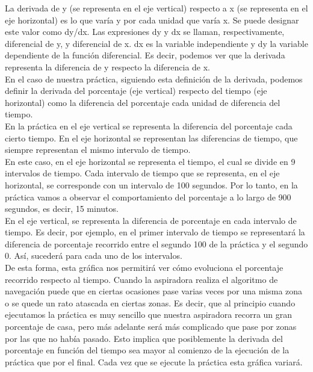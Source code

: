 La derivada de y (se representa en el eje vertical) respecto a x (se representa en el eje horizontal) es lo que varía y por cada unidad que varía x. Se puede designar este valor como dy/dx. Las expresiones dy y dx se llaman, respectivamente, diferencial de y, y diferencial de x. dx es la variable independiente y dy la variable dependiente de la función diferencial. Es decir, podemos ver que la derivada representa la diferencia de y respecto la diferencia de x. \\

En el caso de nuestra práctica, siguiendo esta definición de la derivada, podemos definir la derivada del porcentaje (eje vertical) respecto del tiempo (eje horizontal) como la diferencia del porcentaje cada unidad de diferencia del tiempo.\\

En la práctica en el eje vertical se representa la diferencia del porcentaje cada cierto tiempo. En el eje horizontal se representan las diferencias de tiempo, que siempre representan el mismo intervalo de tiempo. \\

En este caso, en el eje horizontal se representa el tiempo, el cual se divide en 9 intervalos de tiempo. Cada intervalo de tiempo que se representa, en el eje horizontal, se corresponde con un intervalo de 100 segundos. Por lo tanto, en la práctica vamos a observar el comportamiento del porcentaje a lo largo de 900 segundos, es decir, 15 minutos.\\

En el eje vertical, se representa la diferencia de porcentaje en cada intervalo de tiempo. Es decir, por ejemplo, en el primer intervalo de tiempo se representará la diferencia de porcentaje recorrido entre el segundo 100 de la práctica y el segundo 0. Así, sucederá para cada uno de los intervalos.\\

De esta forma, esta gráfica nos permitirá ver cómo evoluciona el porcentaje recorrido respecto al tiempo. Cuando la aspiradora realiza el algoritmo de navegación puede que en ciertas ocasiones pase varias veces por una misma zona o se quede un rato atascada en ciertas zonas. Es decir, que al principio cuando ejecutamos la práctica es muy sencillo que nuestra aspiradora recorra un gran porcentaje de casa, pero más adelante será más complicado que pase por zonas por las que no había pasado. Esto implica que posiblemente la derivada del porcentaje en función del tiempo sea mayor al comienzo de la ejecución de la práctica que por el final. Cada vez que se ejecute la práctica esta gráfica variará.\\

